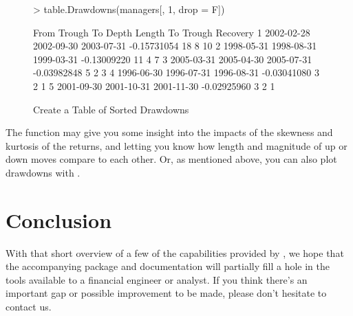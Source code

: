 \documentclass[12pt,letterpaper,english]{article}
\begin{document}
%
\begin{figure}

\caption{Create a Table of Sorted Drawdowns}

\label{fig:Drawdowns-Table}

\begin{Schunk}
\begin{Sinput}
> table.Drawdowns(managers[, 1, drop = F])
\end{Sinput}
\begin{Soutput}
        From     Trough         To       Depth Length To Trough Recovery
1 2002-02-28 2002-09-30 2003-07-31 -0.15731054     18         8       10
2 1998-05-31 1998-08-31 1999-03-31 -0.13009220     11         4        7
3 2005-03-31 2005-04-30 2005-07-31 -0.03982848      5         2        3
4 1996-06-30 1996-07-31 1996-08-31 -0.03041080      3         2        1
5 2001-09-30 2001-10-31 2001-11-30 -0.02925960      3         2        1
\end{Soutput}
\end{Schunk}
\end{figure}


The  function may give you some insight
into the impacts of the skewness and kurtosis of the returns, and
letting you know how length and magnitude of up or down moves compare
to each other. Or, as mentioned above, you can also plot drawdowns
with .




\section{Conclusion}

With that short overview of a few of the capabilities provided by
,
we hope that the accompanying package and documentation will partially
fill a hole in the tools available to a financial engineer or analyst.
If you think there's an important gap or possible improvement to be
made, please don't hesitate to contact us.
\end{document}
